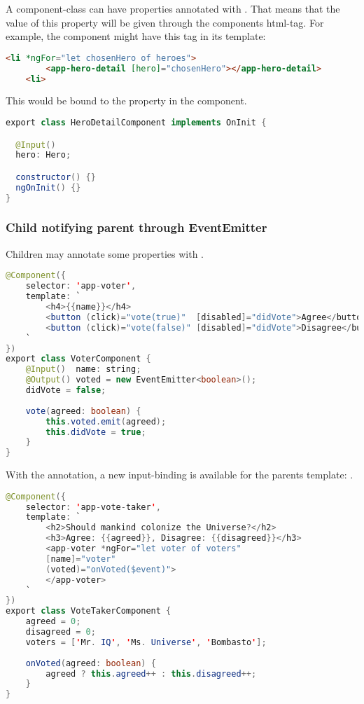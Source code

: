 A component-class can have properties annotated with . That means that the value of this property will be given through the components html-tag. 
For example, the component  might have this tag in its template:

\begin{lstlisting}[language=html]
    <li *ngFor="let chosenHero of heroes"> 
        <app-hero-detail [hero]="chosenHero"></app-hero-detail>
    <li>
\end{lstlisting}

This  would be bound to the  property in the  component.

\begin{lstlisting}[language=java]
export class HeroDetailComponent implements OnInit {

  @Input()
  hero: Hero;

  constructor() {}
  ngOnInit() {}
}
\end{lstlisting}

\subsubsection{Child notifying parent through EventEmitter}
Children may annotate some properties with .
\begin{lstlisting}[language=java]
@Component({
    selector: 'app-voter',
    template: `
        <h4>{{name}}</h4>
        <button (click)="vote(true)"  [disabled]="didVote">Agree</button>
        <button (click)="vote(false)" [disabled]="didVote">Disagree</button>
    `
})
export class VoterComponent {
    @Input()  name: string;
    @Output() voted = new EventEmitter<boolean>();
    didVote = false;
    
    vote(agreed: boolean) {
        this.voted.emit(agreed);
        this.didVote = true;
    }
}
\end{lstlisting}

With the  annotation, a new input-binding is available for the parents template: .
\begin{lstlisting}[language=java]
@Component({
    selector: 'app-vote-taker',
    template: `
        <h2>Should mankind colonize the Universe?</h2>
        <h3>Agree: {{agreed}}, Disagree: {{disagreed}}</h3>
        <app-voter *ngFor="let voter of voters"
        [name]="voter"
        (voted)="onVoted($event)">
        </app-voter>
    `
})
export class VoteTakerComponent {
    agreed = 0;
    disagreed = 0;
    voters = ['Mr. IQ', 'Ms. Universe', 'Bombasto'];
    
    onVoted(agreed: boolean) {
        agreed ? this.agreed++ : this.disagreed++;
    }
}
\end{lstlisting}


